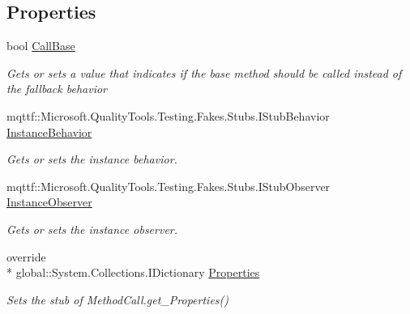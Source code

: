 \subsection*{Properties}
\begin{DoxyCompactItemize}
\item 
bool \hyperlink{class_system_1_1_runtime_1_1_remoting_1_1_messaging_1_1_fakes_1_1_stub_method_call_abb4fdfed9703181d7a61ef7c6d69f3c6}{Call\-Base}
\begin{DoxyCompactList}\small\item\em Gets or sets a value that indicates if the base method should be called instead of the fallback behavior\end{DoxyCompactList}\item 
mqttf\-::\-Microsoft.\-Quality\-Tools.\-Testing.\-Fakes.\-Stubs.\-I\-Stub\-Behavior \hyperlink{class_system_1_1_runtime_1_1_remoting_1_1_messaging_1_1_fakes_1_1_stub_method_call_a5edc7ee0b9630648cd67a5f2894ea66b}{Instance\-Behavior}
\begin{DoxyCompactList}\small\item\em Gets or sets the instance behavior.\end{DoxyCompactList}\item 
mqttf\-::\-Microsoft.\-Quality\-Tools.\-Testing.\-Fakes.\-Stubs.\-I\-Stub\-Observer \hyperlink{class_system_1_1_runtime_1_1_remoting_1_1_messaging_1_1_fakes_1_1_stub_method_call_a93209fb8f69bea4fddf6cb2dd669691c}{Instance\-Observer}
\begin{DoxyCompactList}\small\item\em Gets or sets the instance observer.\end{DoxyCompactList}\item 
override \\*
global\-::\-System.\-Collections.\-I\-Dictionary \hyperlink{class_system_1_1_runtime_1_1_remoting_1_1_messaging_1_1_fakes_1_1_stub_method_call_a9e6924dbd84099f17863311202d355aa}{Properties}
\begin{DoxyCompactList}\small\item\em Sets the stub of Method\-Call.\-get\-\_\-\-Properties()\end{DoxyCompactList}\end{DoxyCompactItemize}


